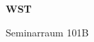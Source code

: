 \documentclass[a4paper]{article}
\begin{document}
\printGenericVSLHeader
\begin{center}
\begin{vsltext}{3cm}{4cm}

   \vspace{0.5cm} 

    \textbf{WST} 

    \vspace{1.5cm}

    Seminarraum 101B

\end{vsltext}

\end{center}
\end{document}
